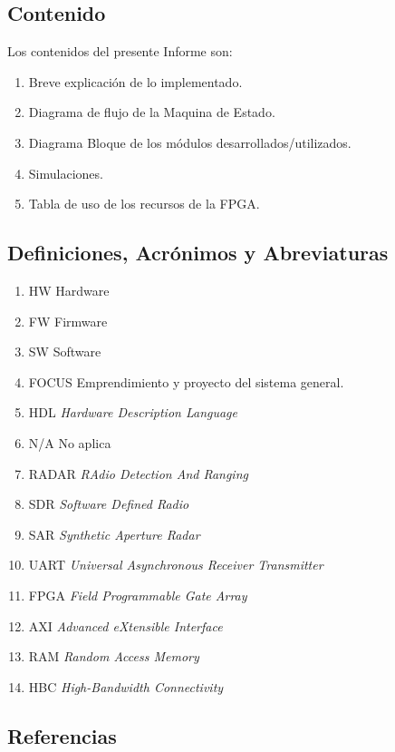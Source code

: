\documentclass[
11pt, %
]{charter}
\begin{document}
\subsection{Contenido}
\label{sec:org434c3ef}

Los contenidos del presente Informe son:
\begin{enumerate}
	 \item Breve explicación de lo implementado.
	 \item Diagrama de flujo de la Maquina de Estado.
	 \item Diagrama Bloque de los módulos desarrollados/utilizados.
	 \item Simulaciones.
	 \item Tabla de uso de los recursos de la FPGA.
\end{enumerate}


\subsection{Definiciones, Acrónimos y Abreviaturas}
\label{sec:orgb158e36}

\begin{enumerate}
\item HW	Hardware
\item FW	Firmware
\item SW 	Software
\item FOCUS Emprendimiento y proyecto del sistema general.
\item HDL 	\textit{Hardware Description Language} 
\item N/A 	No aplica 
\item RADAR	\textit{RAdio Detection And Ranging}
\item SDR 	\textit{Software Defined Radio}
\item SAR	\textit{Synthetic Aperture Radar}
\item UART 	\textit{Universal Asynchronous Receiver Transmitter} 
\item FPGA 	\textit{Field Programmable Gate Array} 
\item AXI 	\textit{Advanced eXtensible Interface} 
\item RAM 	\textit{Random Access Memory}
\item HBC	\textit{High-Bandwidth Connectivity}
\end{enumerate}




\subsection{Referencias}
\label{sec:org62711e0}
\end{document}
